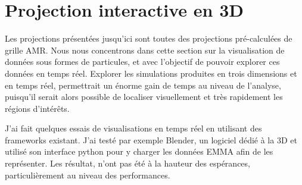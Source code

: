 \section{Projection interactive en 3D}
%
%
%


Les projections présentées jusqu'ici sont toutes des projections pré-calculées de grille \ac{AMR}.
Nous nous concentrons dans cette section sur la visualisation de données sous formes de particules, et avec l'objectif de pouvoir explorer ces données en temps réel.
Explorer les simulations produites en trois dimensions et en temps réel, permettrait un énorme gain de temps au niveau de l'analyse, puisqu'il serait alors possible de localiser visuellement et très rapidement les régions d’intérêts.

J'ai fait quelques essais de visualisations en temps réel en utilisant des frameworks existant.
J'ai testé par exemple Blender, un logiciel dédié à la 3D et utilisé son interface python pour y charger les données EMMA afin de les représenter.
Les résultat, n'ont pas été à la hauteur des espérances, particulièrement au niveau des performances.

